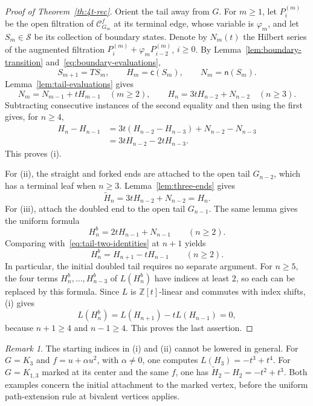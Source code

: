 \documentclass[reqno]{article}
\theoremstyle{plain} %
\theoremstyle{definition}
\theoremstyle{remark}
\newtheorem{remark}[theorem]{\sc Remark}
\newcommand{\Z}{{\mathbb{Z}}}
\newcommand {\CC}{\mathscr{C}}
\numberwithin{equation}{section}
\begin{document}
\begin{proof}[Proof of Theorem~\ref{th:4t-rec}]
Orient the tail away from \(G\). For \(m\ge1\), let
\(P^{(m)}_i\) be the open filtration of \(\CC^f_{G_m}\) at its terminal
edge, whose variable is \(\varphi_m\), and let \(S_m\in\mathcal S\)
be its collection of boundary states. Denote by \(N_m(t)\) the
Hilbert series of the augmented filtration
\(P^{(m)}_i+\varphi_m P^{(m)}_{i-2}\), \(i\ge0\).
By Lemma~\ref{lem:boundary-transition} and~\eqref{eq:boundary-evaluations},
\[
S_{m+1}=TS_m,\qquad H_m=\mathsf c(S_m),\qquad
N_m=\mathsf n(S_m).
\]
Lemma~\ref{lem:tail-evaluations} gives
\begin{equation}
\label{eq:tail-two-identities}
N_m=N_{m-1}+tH_{m-1}\quad(m\ge2),\qquad
H_n=3tH_{n-2}+N_{n-2}\quad(n\ge3).
\end{equation}
Subtracting consecutive instances of the second equality and then
using the first gives, for \(n\ge4\),
\[
\begin{aligned}
H_n-H_{n-1}
&=3t(H_{n-2}-H_{n-3})+N_{n-2}-N_{n-3}\\
&=3tH_{n-2}-2tH_{n-3}.
\end{aligned}
\]
This proves (i).

For (ii), the straight and forked ends are attached to the open tail
\(G_{n-2}\), which has a terminal leaf when \(n\ge3\).
Lemma~\ref{lem:three-ends} gives
\[
\widetilde H_n=3tH_{n-2}+N_{n-2}=H_n.
\]
For (iii), attach the doubled end to the open tail \(G_{n-1}\).
The same lemma gives the uniform formula
\begin{equation}
\label{eq:double-end-uniform}
H_n^b=2tH_{n-1}+N_{n-1}\qquad(n\ge2).
\end{equation}
Comparing with~\eqref{eq:tail-two-identities} at \(n+1\) yields
\[
H_n^b=H_{n+1}-tH_{n-1}\qquad(n\ge2).
\]
In particular, the initial doubled tail requires no separate argument.
For \(n\ge5\), the four terms \(H^b_n,\ldots,H^b_{n-3}\) of
\(L(H_n^b)\) have indices at least \(2\), so each can be replaced by
this formula. Since \(L\) is \(\Z[t]\)-linear and commutes with index
shifts, (i) gives
\[
L(H_n^b)=L(H_{n+1})-tL(H_{n-1})=0,
\]
because \(n+1\ge4\) and \(n-1\ge4\).
This proves the last assertion.
\end{proof}

\begin{remark}
\label{rem:tail-initial}
The starting indices in (i) and (ii) cannot be lowered in general.
For \(G=K_3\) and \(f=u+\alpha u^2\), with \(\alpha\ne0\),
one computes \(L(H_3)=-t^3+t^4\). For \(G=K_{1,3}\) marked at
its center and the same \(f\), one has
\(\widetilde H_2-H_2=-t^2+t^3\). Both examples concern the initial
attachment to the marked vertex, before the uniform path-extension rule at
bivalent vertices applies.
\end{remark}
\end{document}
